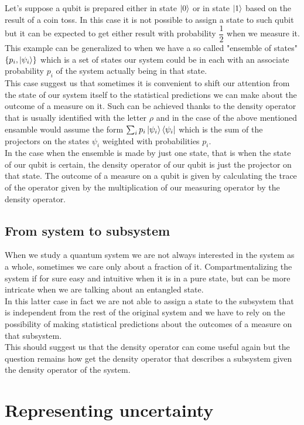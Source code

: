 \documentclass{article}
\begin{document}
Let's suppose a qubit is prepared either in state $\ket{0}$ or in
state $\ket{1}$ based on the result of a coin toss.
In this case it is not possible to assign a state to such qubit
but it can be expected to get either result with probability
$\dfrac{1}{2}$  when we measure it.
This example can be generalized to when we have a so called
"ensemble of states" $\{p_i,\ket{\psi_i}\}$ which is a set of
states our system could be in each with an associate probability $p_i$
of the system actually being in that state.\\
This case suggest us that sometimes it is convenient to
shift our attention from the state of our system itself to the
statistical predictions we can make about the outcome of a measure on it.
Such can be achieved thanks to the density operator that
is usually identified with the letter $\rho$ and in the case of the above
mentioned ensamble would assume the form $\sum_i p_i \ket{\psi_i}\bra{\psi_i}$
which is the sum of the projectors on the states $\psi_i$ weighted with
probabilities $p_i$. \\
In the case when the ensemble is made by just one state,
that is when the state of our qubit is certain,
the density operator of our qubit is just the projector on
that state.
The outcome of a measure on a qubit is given by calculating
the trace of the operator given by the multiplication of our
measuring operator by the density operator.


\subsection{From system to subsystem}

When we study a quantum system we are not always interested in the
system as a whole, sometimes we care only about a fraction of it.
Compartmentalizing the system if for sure easy and intuitive when it
is in a pure state, but can be more intricate when we are talking about
an entangled state.\\
In this latter case in fact we are not able to assign a state to the
subsystem that is independent from the rest of the original system
and we have to rely on the possibility of making statistical
predictions about the outcomes of a measure on that subsystem.\\
This should suggest us that the density operator can come useful
again but the question remains how get the density operator that
describes a subsystem given the density operator of the system.
\section{Representing uncertainty}
\end{document}
